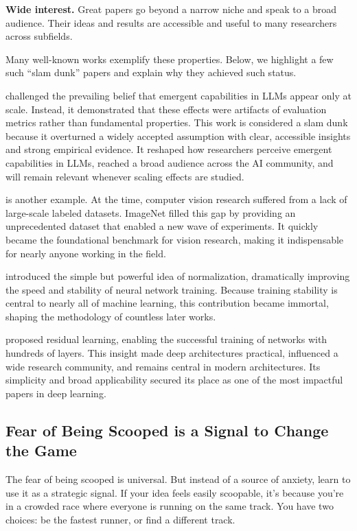 \textbf{Wide interest.} Great papers go beyond a narrow niche and speak to a broad audience.
Their ideas and results are accessible and useful to many researchers across subfields.

Many well-known works exemplify these properties.
Below, we highlight a few such ``slam dunk'' papers and explain why they achieved such status.

\cite{mirage} challenged the prevailing belief that emergent capabilities in LLMs appear only at scale.
Instead, it demonstrated that these effects were artifacts of evaluation metrics rather than fundamental properties.
This work is considered a slam dunk because it overturned a widely accepted assumption with clear, accessible insights and strong empirical evidence.
It reshaped how researchers perceive emergent capabilities in LLMs, reached a broad audience across the AI community, and will remain relevant whenever scaling effects are studied.

\cite{imagenet} is another example.
At the time, computer vision research suffered from a lack of large-scale labeled datasets.
ImageNet filled this gap by providing an unprecedented dataset that enabled a new wave of experiments.
It quickly became the foundational benchmark for vision research, making it indispensable for nearly anyone working in the field.

\cite{batchnorm} introduced the simple but powerful idea of normalization, dramatically improving the speed and stability of neural network training.
Because training stability is central to nearly all of machine learning, this contribution became immortal, shaping the methodology of countless later works.

\cite{resnet} proposed residual learning, enabling the successful training of networks with hundreds of layers.
This insight made deep architectures practical, influenced a wide research community, and remains central in modern architectures.
Its simplicity and broad applicability secured its place as one of the most impactful papers in deep learning.

\subsection{Fear of Being Scooped is a Signal to Change the Game}

The fear of being scooped is universal.
But instead of a source of anxiety, learn to use it as a strategic signal.
If your idea feels easily scoopable, it's because you're in a crowded race where everyone is running on the same track.
You have two choices: be the fastest runner, or find a different track.

